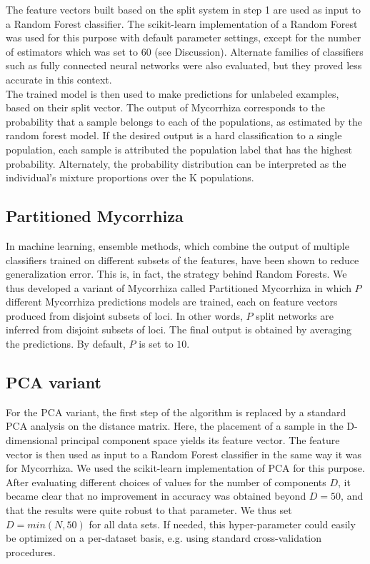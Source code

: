 \documentclass[final]{bioinfo}
\begin{document}
\begin{methods}
The feature vectors built based on the split system in step 1 are used as input to a Random Forest classifier. The scikit-learn implementation of a Random Forest was used for this purpose with default parameter settings, except for the number of estimators which was set to 60 (see Discussion). Alternate families of classifiers such as fully connected neural networks were also evaluated, but they proved less accurate in this context.\\
The trained model is then used to make predictions for unlabeled examples, based on their split vector. The output of Mycorrhiza corresponds to the probability that a sample belongs to each of the  populations, as estimated by the random forest model. If the desired output is a hard classification to a single population, each sample is attributed the population label that has the highest probability. Alternately, the probability distribution can be interpreted as the individual's mixture proportions over the K populations.
\subsection{Partitioned Mycorrhiza}
In machine learning, ensemble methods, which combine the output of multiple classifiers trained on different subsets of the features, have been shown to reduce generalization error. This is, in fact, the strategy behind Random Forests. We thus developed a variant of Mycorrhiza called Partitioned Mycorrhiza in which $P$ different Mycorrhiza predictions models are trained, each on feature vectors produced from disjoint subsets of loci. In other words, $P$ split networks are inferred from disjoint subsets of loci. The final output is obtained by averaging the  predictions. By default, $P$ is set to $10$.
\subsection{PCA variant}
For the PCA variant, the first step of the algorithm is replaced by a standard PCA analysis on the distance matrix. Here, the placement of a sample in the D-dimensional principal component space yields its feature vector. The feature vector is then used as input to a Random Forest classifier in the same way it was for Mycorrhiza. We used the scikit-learn implementation of PCA for this purpose. After evaluating different choices of values for the number of components $D$, it became clear that no improvement in accuracy was obtained beyond $D=50$, and that the results were quite robust to that parameter. We thus set $D = min(N, 50)$ for all data sets. If needed, this hyper-parameter could easily be optimized on a per-dataset basis, e.g. using standard cross-validation procedures.

\end{methods}
\end{document}
